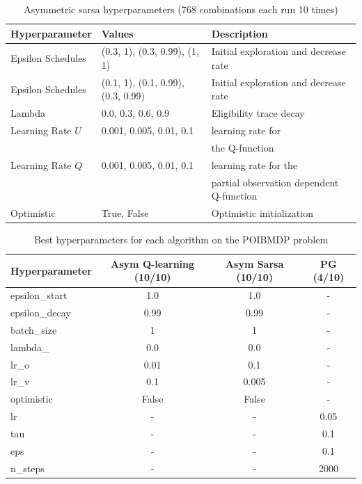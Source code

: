 \begin{table}
\centering
\small
\caption{Asymmetric sarsa hyperparameters (768 combinations each run 10 times)}\label{tab:hp-sarsa}
\begin{tabular}{lll}
\toprule
\textbf{Hyperparameter} & \textbf{Values} & \textbf{Description} \\
\midrule
Epsilon Schedules & (0.3, 1), (0.3, 0.99), (1, 1) & Initial exploration and decrease rate \\
Epsilon Schedules & (0.1, 1), (0.1, 0.99), (0.3, 0.99) & Initial exploration and decrease rate \\
Lambda & 0.0, 0.3, 0.6, 0.9 & Eligibility trace decay \\
Learning Rate $U$ & 0.001, 0.005, 0.01, 0.1 & learning rate for \\
 & & the Q-function \\
Learning Rate $Q$ & 0.001, 0.005, 0.01, 0.1 & learning rate for the \\
 & & partial observation dependent Q-function \\
Optimistic & True, False & Optimistic initialization \\
\bottomrule
\end{tabular}
\end{table}

\begin{table}
    \centering
    \begin{tabular}{|l|c|c|c|}
    \textbf{Hyperparameter} & \textbf{Asym Q-learning (10/10)} & \textbf{Asym Sarsa (10/10)} & \textbf{PG (4/10)} \\
    \toprule
    epsilon\_start & 1.0 & 1.0 & - \\
    epsilon\_decay & 0.99 & 0.99 & - \\
    batch\_size & 1 & 1 & - \\
    lambda\_ & 0.0 & 0.0 & - \\
    lr\_o & 0.01 & 0.1 & - \\
    lr\_v & 0.1 & 0.005 & - \\
    optimistic & False & False & - \\
    lr & - & - & 0.05 \\
    tau & - & - & 0.1 \\
    eps & - & - & 0.1 \\
    n\_steps & - & - & 2000 \\
    \bottomrule
    \end{tabular}
    \caption{Best hyperparameters for each algorithm on the POIBMDP problem}
    \label{tab:algorithm-hyperparameters}
    \end{table}

